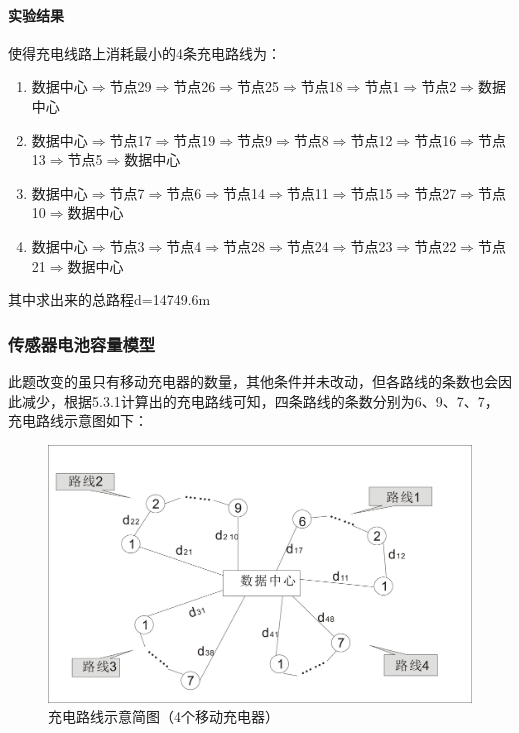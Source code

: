 \documentclass{article}
\begin{document}
\paragraph{实验结果}
使得充电线路上消耗最小的4条充电路线为：
\vspace{2ex}
\begin{enumerate}[\indent 路线1：] 
    \item 数据中心$\Rightarrow$节点29\;$\Rightarrow$节点26\;$\Rightarrow$节点25\;$\Rightarrow$节点18\;$\Rightarrow$节点1\;$\Rightarrow$节点2\;$\Rightarrow$数据中心
    \item 数据中心$\Rightarrow$节点17\;$\Rightarrow$节点19\;$\Rightarrow$节点9\;$\Rightarrow$节点8\;$\Rightarrow$节点12\;$\Rightarrow$节点16\;$\Rightarrow$节点13\;$\Rightarrow$节点5\;$\Rightarrow$数据中心
    \item 数据中心$\Rightarrow$节点7\;$\Rightarrow$节点6\;$\Rightarrow$节点14\;$\Rightarrow$节点11\;$\Rightarrow$节点15\;$\Rightarrow$节点27\;$\Rightarrow$节点10\;$\Rightarrow$数据中心
    \item 数据中心$\Rightarrow$节点3\;$\Rightarrow$节点4\;$\Rightarrow$节点28\;$\Rightarrow$节点24\;$\Rightarrow$节点23\;$\Rightarrow$节点22\;$\Rightarrow$节点21\;$\Rightarrow$数据中心 
\end{enumerate} 
\vspace{2ex}

其中求出来的总路程d=14749.6m

\subsubsection{传感器电池容量模型}
此题改变的虽只有移动充电器的数量，其他条件并未改动，但各路线的条数也会因此减少，根据5.3.1计算出的充电路线可知，四条路线的条数分别为6、9、7、7，充电路线示意图如下：
\begin{figure}[H]
    \centering
    \includegraphics[scale=0.4]{10.jpg}
    \caption{充电路线示意简图（4个移动充电器）}
\end{figure}
\end{document}
